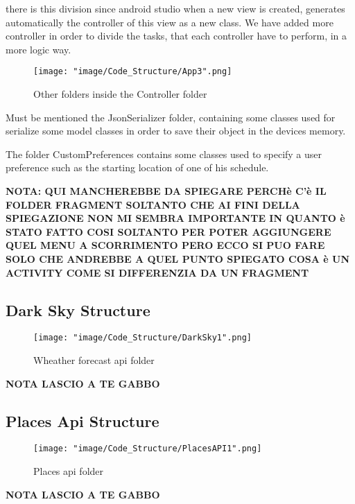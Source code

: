 there is this division since android studio when a new view is created, generates automatically the controller of this view as a new class. We have added more controller in order to divide the tasks, that each controller have to perform, in a more logic way.

\begin{figure}[H]
\begin{center}
\texttt{[image: "image/Code\_Structure/App3".png]}
\caption{Other folders inside the Controller folder}
\end{center}
\end{figure}

Must be mentioned the JsonSerializer folder, containing some classes used for serialize some model classes in order to save their object in the devices memory.

The folder CustomPreferences contains some classes used to specify a user preference such as the starting location of one of his schedule.

\textbf{NOTA: QUI MANCHEREBBE DA SPIEGARE PERCHè C'è IL FOLDER FRAGMENT SOLTANTO CHE AI FINI DELLA SPIEGAZIONE NON MI SEMBRA IMPORTANTE IN QUANTO è STATO FATTO COSI SOLTANTO PER POTER AGGIUNGERE QUEL MENU A SCORRIMENTO PERO ECCO SI PUO FARE SOLO CHE ANDREBBE A QUEL PUNTO SPIEGATO COSA è UN ACTIVITY COME SI DIFFERENZIA DA UN FRAGMENT}

\subsection{Dark Sky Structure}

\begin{figure}[H]
\begin{center}
\texttt{[image: "image/Code\_Structure/DarkSky1".png]}
\caption{Wheather forecast api folder}
\end{center}
\end{figure}

\textbf{NOTA LASCIO A TE GABBO}

\subsection{Places Api Structure}

\begin{figure}[H]
\begin{center}
\texttt{[image: "image/Code\_Structure/PlacesAPI1".png]}
\caption{Places api folder}
\end{center}
\end{figure}

\textbf{NOTA LASCIO A TE GABBO}





 
 
 
 









